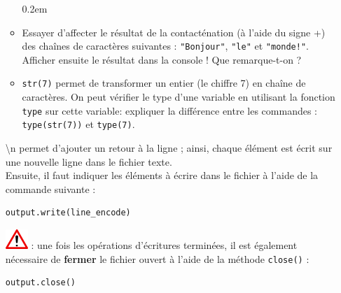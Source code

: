\documentclass[11pt]{article}
\begin{document}
\begin{enumerate}
\begin{minipage}[t]{0.88\textwidth}
\begin{itemize}\itemsep0.2em
\renewcommand\labelitemi{\--}
\item Essayer d'affecter le résultat de la contacténation (à l'aide du signe \og{}+\fg{}) des chaînes de caractères suivantes : \texttt{"Bonjour"}, \texttt{"le"} et \texttt{"monde!"}. Afficher ensuite le résultat dans la console ! Que remarque-t-on ?
\item \texttt{str(7)} permet de transformer un entier (le chiffre 7) en chaîne de caractères. On peut vérifier le type d'une variable en utilisant la fonction \texttt{type} sur cette variable: expliquer la différence entre les commandes : \texttt{type{(str(7))}} et \texttt{type{(7)}}.
\end{itemize}
\end{minipage}
\vspace*{1em}

\og{}\textbackslash{}n\fg{} permet d'ajouter un retour à la ligne ; ainsi, chaque élément est écrit sur une nouvelle ligne dans le fichier texte. \\


Ensuite, il faut indiquer les éléments à écrire dans le fichier à l'aide de la commande suivante : 
\vspace*{-0.64em}
\begin{center}
\begin{minipage}[t]{0.30\textwidth}
\begin{verbatim}
output.write(line_encode)
\end{verbatim}
\end{minipage}
\end{center}
\vspace*{1em}



\includegraphics[scale=1]{warningt.png} \underline{}: une fois les opérations d'écritures terminées, il est également nécessaire de \textbf{fermer} le fichier ouvert à l'aide de la méthode \texttt{close()} : 
\vspace*{-1em}
\begin{center}
\begin{minipage}[t]{0.18\textwidth}
\begin{verbatim}
output.close()
\end{verbatim}
\end{minipage}
\end{center}
\vspace*{1em}



\end{enumerate}
\end{document}
